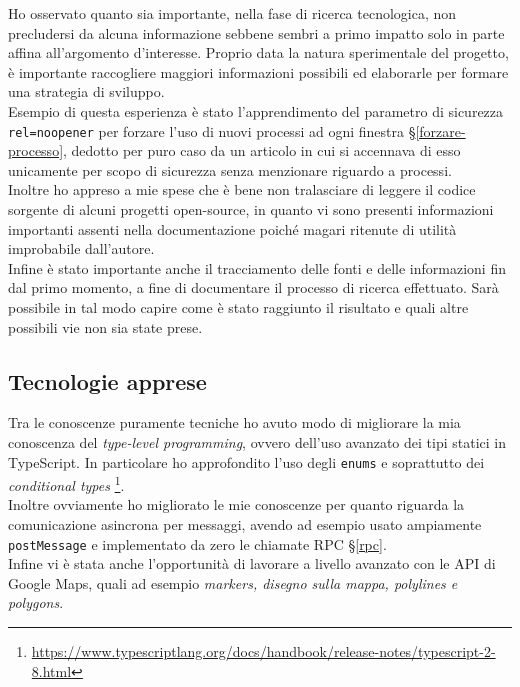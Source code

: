 Ho osservato quanto sia importante, nella fase di ricerca tecnologica, non precludersi da alcuna informazione sebbene sembri a primo impatto solo in parte affina all'argomento d'interesse. Proprio data la natura sperimentale del progetto, è importante raccogliere maggiori informazioni possibili ed elaborarle per formare una strategia di sviluppo. \\

Esempio di questa esperienza è stato l'apprendimento del parametro di sicurezza \texttt{rel=noopener} per forzare l'uso di nuovi processi ad ogni finestra §\ref{forzare-processo}, dedotto per puro caso da un articolo in cui si accennava di esso unicamente per scopo di sicurezza senza menzionare riguardo a processi. \\

Inoltre ho appreso a mie spese che è bene non tralasciare di leggere il codice sorgente di alcuni progetti open-source, in quanto vi sono presenti informazioni importanti assenti nella documentazione poiché magari ritenute di utilità improbabile dall'autore. \\

Infine è stato importante anche il tracciamento delle fonti e delle informazioni fin dal primo momento, a fine di documentare il processo di ricerca effettuato. Sarà possibile in tal modo capire come è stato raggiunto il risultato e quali altre possibili vie non sia state prese.

\subsection{Tecnologie apprese}

Tra le conoscenze puramente tecniche ho avuto modo di migliorare la mia conoscenza del \textit{type-level programming}, ovvero dell'uso avanzato dei tipi statici in TypeScript. In particolare ho approfondito l'uso degli \texttt{enums} e soprattutto dei \textit{conditional types} \footnote{\url{https://www.typescriptlang.org/docs/handbook/release-notes/typescript-2-8.html}}. \\

Inoltre ovviamente ho migliorato le mie conoscenze per quanto riguarda la comunicazione asincrona per messaggi, avendo ad esempio usato ampiamente \texttt{postMessage} e implementato da zero le chiamate RPC §\ref{rpc}. \\

Infine vi è stata anche l'opportunità di lavorare a livello avanzato con le API di Google Maps, quali ad esempio \textit{markers, disegno sulla mappa, polylines e polygons}.

